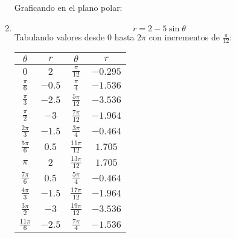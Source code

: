 \begin{multicols}{2}
\begin{enumerate}
    Graficando en el plano polar:
    \begin{center}
    \end{center}
    \item \[
      r = 2-5\sin{\theta}
    \]
    Tabulando valores desde \( 0 \) hasta \( 2\pi \) con incrementos de \( \frac{\pi}{12} \):
    \begin{center}
      \begin{tabular}{|c|c||c|c|}
        \hline
        \( \theta \) & \( r \) & \( \theta \) & \( r \) \\
        \hline
        \( 0 \) & \( 2 \) & \( \frac{\pi}{12} \) & \( -0.295 \) \\
        \( \frac{\pi}{6} \) & \( -0.5 \) & \( \frac{\pi}{4} \) & \( -1.536 \) \\
        \( \frac{\pi}{3} \) & \( -2.5 \) & \( \frac{5\pi}{12} \) & \( -3.536 \) \\
        \( \frac{\pi}{2} \) & \( -3 \) & \( \frac{7\pi}{12} \) & \( -1.964 \) \\
        \( \frac{2\pi}{3} \) & \( -1.5 \) & \( \frac{3\pi}{4} \) & \( -0.464 \) \\
        \( \frac{5\pi}{6} \) & \( 0.5 \) & \( \frac{11\pi}{12} \) & \( 1.705 \) \\
        \( \pi \) & \( 2 \) & \( \frac{13\pi}{12} \) & \( 1.705 \) \\
        \( \frac{7\pi}{6} \) & \( 0.5 \) & \( \frac{5\pi}{4} \) & \( -0.464 \) \\
        \( \frac{4\pi}{3} \) & \( -1.5 \) & \( \frac{17\pi}{12} \) & \( -1.964 \) \\
        \( \frac{3\pi}{2} \) & \( -3 \) & \( \frac{19\pi}{12} \) & \( -3.536 \) \\
        \( \frac{11\pi}{6} \) & \( -2.5 \) & \( \frac{7\pi}{4} \) & \( -1.536 \) \\

\end{tabular}
\end{center}
\end{enumerate}
\end{multicols}
